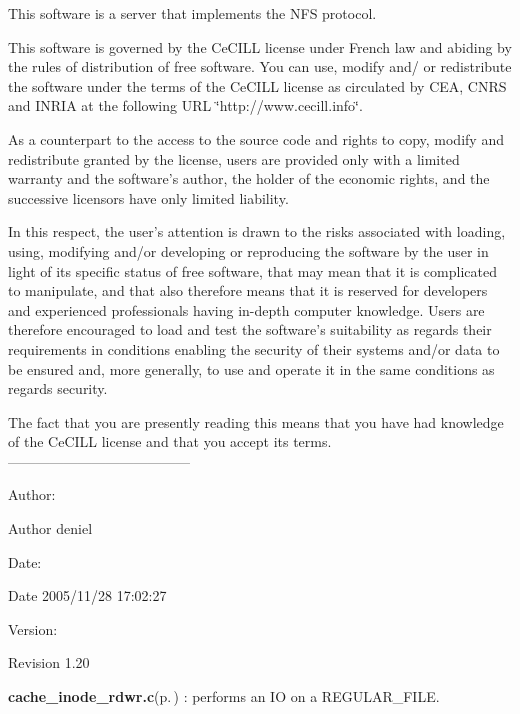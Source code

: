 This software is a server that implements the NFS protocol.

This software is governed by the Ce\-CILL license under French law and abiding by the rules of distribution of free software. You can use, modify and/ or redistribute the software under the terms of the Ce\-CILL license as circulated by CEA, CNRS and INRIA at the following URL \char`\"{}http://www.cecill.info\char`\"{}.

As a counterpart to the access to the source code and rights to copy, modify and redistribute granted by the license, users are provided only with a limited warranty and the software's author, the holder of the economic rights, and the successive licensors have only limited liability.

In this respect, the user's attention is drawn to the risks associated with loading, using, modifying and/or developing or reproducing the software by the user in light of its specific status of free software, that may mean that it is complicated to manipulate, and that also therefore means that it is reserved for developers and experienced professionals having in-depth computer knowledge. Users are therefore encouraged to load and test the software's suitability as regards their requirements in conditions enabling the security of their systems and/or data to be ensured and, more generally, to use and operate it in the same conditions as regards security.

The fact that you are presently reading this means that you have had knowledge of the Ce\-CILL license and that you accept its terms. ---------------------------------------

\begin{Desc}
\item[Author:]\begin{Desc}
\item[Author]deniel \end{Desc}
\end{Desc}
\begin{Desc}
\item[Date:]\begin{Desc}
\item[Date]2005/11/28 17:02:27 \end{Desc}
\end{Desc}
\begin{Desc}
\item[Version:]\begin{Desc}
\item[Revision]1.20 \end{Desc}
\end{Desc}
{\bf cache\_\-inode\_\-rdwr.c}{\rm (p.\,\pageref{cache__inode__rdwr_8c})} : performs an IO on a REGULAR\_\-FILE.

